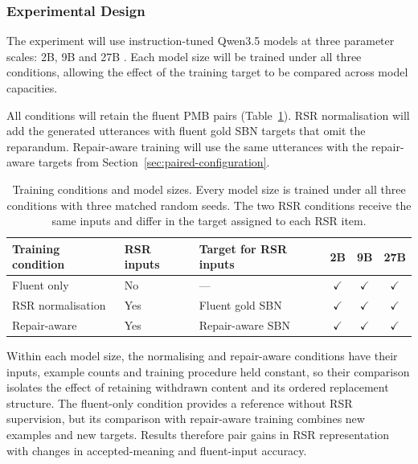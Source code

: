 \subsubsection{Experimental Design}

The experiment will use instruction-tuned Qwen3.5 models at three parameter
scales: 2B, 9B and 27B \citep{qwenQwen35Native2026}. Each model size will be
trained under all three conditions, allowing the effect of the training target
to be compared across model capacities.

All conditions will retain the fluent PMB pairs (Table~\ref{tab:model-experiment}).
RSR normalisation will add the generated utterances with fluent gold SBN targets that omit
the reparandum. Repair-aware training will use the same utterances with the
repair-aware targets from Section~\ref{sec:paired-configuration}.

\begin{table}[ht]
\centering
\small
\begin{tabular}{@{}p{}p{}p{}ccc@{}}
\toprule
Training condition & RSR inputs & Target for RSR inputs & 2B & 9B & 27B \\
\midrule
Fluent only
  & No  & ---                 & $\checkmark$ & $\checkmark$ & $\checkmark$ \\
RSR normalisation
  & Yes & Fluent gold SBN    & $\checkmark$ & $\checkmark$ & $\checkmark$ \\
Repair-aware
  & Yes & Repair-aware SBN    & $\checkmark$ & $\checkmark$ & $\checkmark$ \\
\bottomrule
\end{tabular}
\caption{Training conditions and model sizes. Every model size is trained
under all three conditions with three matched random seeds. The two RSR
conditions receive the same inputs and differ in the target assigned to each
RSR item.}
\label{tab:model-experiment}
\end{table}

Within each model size, the normalising and repair-aware conditions have their
inputs, example counts and training procedure held constant, so their
comparison isolates the effect of retaining withdrawn content and its ordered
replacement structure. The fluent-only condition provides a reference without
RSR supervision, but its comparison with repair-aware training combines new
examples and new targets. Results therefore pair gains in RSR representation
with changes in accepted-meaning and fluent-input accuracy.


